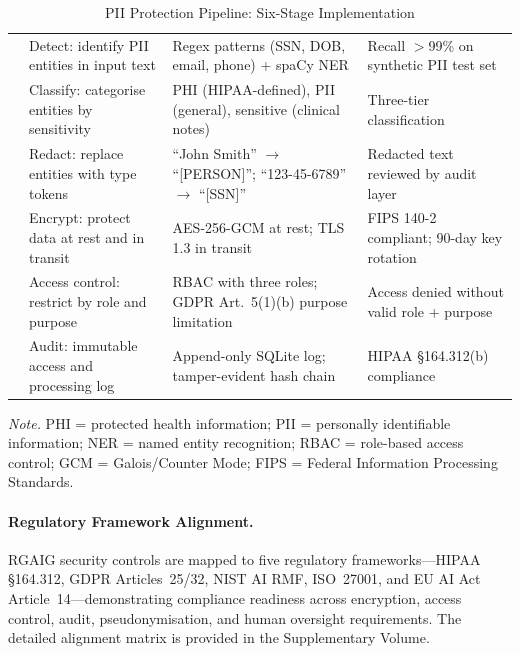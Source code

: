 {\tablestripes\tablefontsize
{}
\begin{xltabular}{\textwidth}{@{} >{\raggedright\arraybackslash}p{1.2cm} L L >{\raggedright\arraybackslash}p{3.8cm} @{}}
\caption[PII Protection Pipeline]{PII Protection Pipeline: Six-Stage Implementation}\label{tab:pii_pipeline} \\
\toprule
\thead{\#} &  &  &  \\
\midrule
\endfirsthead
\endhead
\bottomrule
{} & Detect: identify PII entities in input text & Regex patterns (SSN, DOB, email, phone) + spaCy NER & Recall $>$99\% on synthetic PII test set \\
 & Classify: categorise entities by sensitivity & PHI (HIPAA-defined), PII (general), sensitive (clinical notes) & Three-tier classification \\
 & Redact: replace entities with type tokens & ``John Smith'' $\to$ ``[PERSON]''; ``123-45-6789'' $\to$ ``[SSN]'' & Redacted text reviewed by audit layer \\
 & Encrypt: protect data at rest and in transit & AES-256-GCM at rest; TLS 1.3 in transit & FIPS 140-2 compliant; 90-day key rotation \\
 & Access control: restrict by role and purpose & RBAC with three roles; GDPR Art.~5(1)(b) purpose limitation & Access denied without valid role + purpose \\
 & Audit: immutable access and processing log & Append-only SQLite log; tamper-evident hash chain & HIPAA \S164.312(b) compliance \\
\end{xltabular}}
\vspace{0.5em}\noindent\textit{Note.} PHI = protected health information; PII = personally identifiable information; NER = named entity recognition; RBAC = role-based access control; GCM = Galois/Counter Mode; FIPS = Federal Information Processing Standards.

\iffalse
\paragraph{Regulatory Framework Alignment.}

RGAIG security controls are mapped to five regulatory frameworks---HIPAA \S164.312, GDPR Articles~25/32, NIST AI RMF, ISO~27001, and EU AI Act Article~14---demonstrating compliance readiness across encryption, access control, audit, pseudonymisation, and human oversight requirements. The detailed alignment matrix is provided in the Supplementary Volume.

